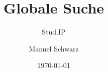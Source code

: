 \documentclass{beamer}
\title{Globale Suche}
\subtitle{Stud.IP}
\author{Manuel Schwarz}
\institute{Uni Osnabrück}
\date{\today}
\begin{document}
    \begin{frame}
        \titlepage
    \end{frame}
\end{document}
